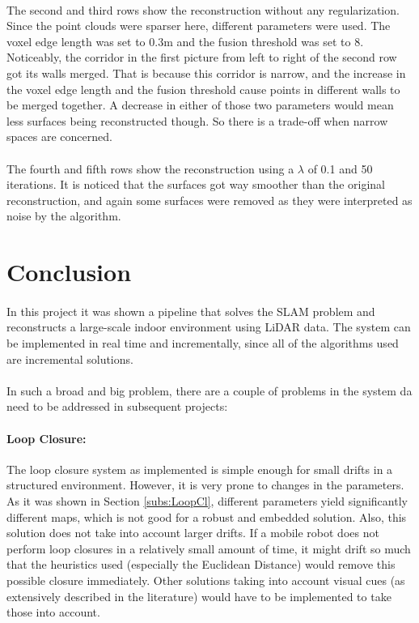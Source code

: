 \documentclass[12pt]{article}
\begin{document}
	\paragraph{}
	The second and third rows show the reconstruction without any regularization. Since the point clouds were sparser here, different parameters were used. The voxel edge length was set to 0.3m and the fusion threshold was set to 8. Noticeably, the corridor in the first picture from left to right of the second row got its walls merged. That is because this corridor is narrow, and the increase in the voxel edge length and the fusion threshold cause points in different walls to be merged together. A decrease in either of those two parameters would mean less surfaces being reconstructed though. So there is a trade-off when narrow spaces are concerned.
	
	\paragraph{}
	The fourth and fifth rows show the reconstruction using a $\lambda$ of 0.1 and 50 iterations. It is noticed that the surfaces got way smoother than the original reconstruction, and again some surfaces were removed as they were interpreted as noise by the algorithm.
		
	\newpage
	\section{Conclusion}
	
	\paragraph{}
	In this project it was shown a pipeline that solves the SLAM problem and reconstructs a large-scale indoor environment using LiDAR data. The system can be implemented in real time and incrementally, since all of the algorithms used are incremental solutions.
	
	\paragraph{}
	In such a broad and big problem, there are a couple of problems in the system da need to be addressed in subsequent projects:
	
	\paragraph{Loop Closure: } The loop closure system as implemented is simple enough for small drifts in a structured environment. However, it is very prone to changes in the parameters. As it was shown in Section \ref{subs:LoopCl}, different parameters yield significantly different maps, which is not good for a robust and embedded solution. Also, this solution does not take into account larger drifts. If a mobile robot does not perform loop closures in a relatively small amount of time, it might drift so much that the heuristics used (especially the Euclidean Distance) would remove this possible closure immediately. Other solutions taking into account visual cues (as extensively described in the literature) would have to be implemented to take those into account.
	
\end{document}
